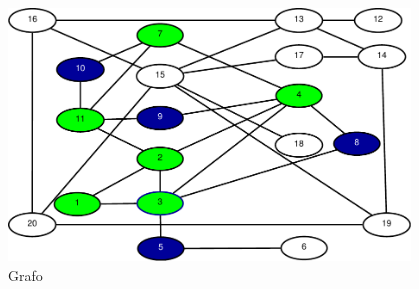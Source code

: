 \begin{frame}
\begin{columns}
\begin{column}{0.5\textwidth}
{\begin{figure}
					\includegraphics[width=\linewidth]{images/buscaEmLargura06}
					\caption{Grafo}
					\label{fig:buscaemlargura07}
				\end{figure}
			}
		\end{column}
		\begin{column}{0.5\textwidth}

		\end{column}
	\end{columns}
\end{frame}

